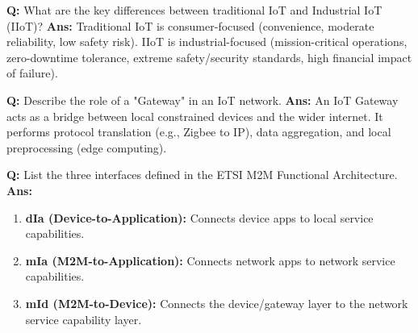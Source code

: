 \documentclass[10pt,a4paper,twocolumn]{article}
\begin{document}
\begin{tcolorbox}[
  colback=white,
  colframe=UnitColorOne,
  colbacktitle=gray!10!white,
  coltitle=black,
  fonttitle=\bfseries\sffamily\small,
  title={Unit I $\bullet$ Card 7},
  boxrule=1.2pt,
  arc=2mm,
  outer arc=2mm,
  boxsep=1.5mm,
  top=1mm,
  bottom=1mm,
  left=1.5mm,
  right=1.5mm,
  before skip=2.5mm,
  after skip=2.5mm
]
\textbf{Q:} What are the key differences between traditional IoT and Industrial IoT (IIoT)?
\tcbline
\textbf{Ans:} Traditional IoT is consumer-focused (convenience, moderate reliability, low safety risk). IIoT is industrial-focused (mission-critical operations, zero-downtime tolerance, extreme safety/security standards, high financial impact of failure).
\end{tcolorbox}


\begin{tcolorbox}[
  colback=white,
  colframe=UnitColorOne,
  colbacktitle=gray!10!white,
  coltitle=black,
  fonttitle=\bfseries\sffamily\small,
  title={Unit I $\bullet$ Card 8},
  boxrule=1.2pt,
  arc=2mm,
  outer arc=2mm,
  boxsep=1.5mm,
  top=1mm,
  bottom=1mm,
  left=1.5mm,
  right=1.5mm,
  before skip=2.5mm,
  after skip=2.5mm
]
\textbf{Q:} Describe the role of a "Gateway" in an IoT network.
\tcbline
\textbf{Ans:} An IoT Gateway acts as a bridge between local constrained devices and the wider internet. It performs protocol translation (e.g., Zigbee to IP), data aggregation, and local preprocessing (edge computing).
\end{tcolorbox}


\begin{tcolorbox}[
  colback=white,
  colframe=UnitColorOne,
  colbacktitle=gray!10!white,
  coltitle=black,
  fonttitle=\bfseries\sffamily\small,
  title={Unit I $\bullet$ Card 9},
  boxrule=1.2pt,
  arc=2mm,
  outer arc=2mm,
  boxsep=1.5mm,
  top=1mm,
  bottom=1mm,
  left=1.5mm,
  right=1.5mm,
  before skip=2.5mm,
  after skip=2.5mm
]
\textbf{Q:} List the three interfaces defined in the ETSI M2M Functional Architecture.
\tcbline
\textbf{Ans:} \begin{enumerate}
  \item \textbf{dIa (Device-to-Application):} Connects device apps to local service capabilities.
  \item \textbf{mIa (M2M-to-Application):} Connects network apps to network service capabilities.
  \item \textbf{mId (M2M-to-Device):} Connects the device/gateway layer to the network service capability layer.
\end{enumerate}
\end{tcolorbox}
\end{document}
